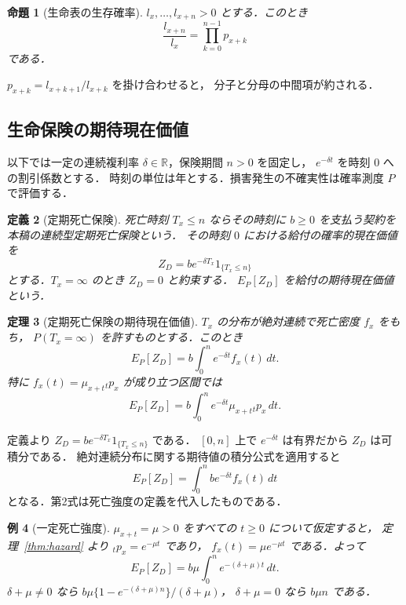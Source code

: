 \documentclass[a5paper,10pt,onecolumn]{jsarticle}
\makeatletter
\theoremstyle{mathnotetheorem}
\newtheorem{theorem}{定理}[section]
\newtheorem{definition}[theorem]{定義}
\newtheorem{proposition}[theorem]{命題}
\newtheorem{example}[theorem]{例}
\renewcommand{\proofname}{証明}
\renewenvironment{proof}[1][\proofname]{%
  \par\pushQED{\qed}\normalfont\topsep4\p@\@plus2\p@\relax
  \trivlist\item[\hskip\labelsep\bfseries #1]\ignorespaces
}{\popQED\endtrivlist\@endpefalse}
\newcommand{\R}{\mathbb{R}}
\makeatother
\begin{document}
\begin{proposition}[生命表の生存確率]\label{prop:lifetable}
$l_x,\ldots,l_{x+n}>0$ とする．このとき
\[
 \frac{l_{x+n}}{l_x}=\prod_{k=0}^{n-1}p_{x+k}
\]
である．
\end{proposition}
\begin{proof}
$p_{x+k}=l_{x+k+1}/l_{x+k}$ を掛け合わせると，
分子と分母の中間項が約される．\end{proof}

\subsection{生命保険の期待現在価値}

以下では一定の連続複利率 $\delta\in\R$，保険期間 $n>0$ を固定し，
$e^{-\delta t}$ を時刻 $0$ への割引係数とする．
時刻の単位は年とする．損害発生の不確実性は確率測度 $P$ で評価する．

\begin{definition}[定期死亡保険]
死亡時刻 $T_x\le n$ ならその時刻に $b\ge0$ を支払う契約を
本稿の\emph{連続型定期死亡保険}という．
その時刻 $0$ における給付の確率的現在価値を
\[
 Z_D=b e^{-\delta T_x}1_{\{T_x\le n\}}
\]
とする．$T_x=\infty$ のとき $Z_D=0$ と約束する．
$E_P[Z_D]$ を\emph{給付の期待現在価値}という．
\end{definition}

\begin{theorem}[定期死亡保険の期待現在価値]\label{thm:deathpv}
$T_x$ の分布が絶対連続で死亡密度 $f_x$ をもち，
$P(T_x=\infty)$ を許すものとする．このとき
\[
 E_P[Z_D]=b\int_0^n e^{-\delta t}f_x(t)\,dt.
\]
特に $f_x(t)=\mu_{x+t}{}_tp_x$ が成り立つ区間では
\[
 E_P[Z_D]=b\int_0^n e^{-\delta t}\mu_{x+t}{}_tp_x\,dt.
\]
\end{theorem}
\begin{proof}
定義より $Z_D=b e^{-\delta T_x}1_{\{T_x\le n\}}$ である．
$[0,n]$ 上で $e^{-\delta t}$ は有界だから $Z_D$ は可積分である．
絶対連続分布に関する期待値の積分公式を適用すると
\[
 E_P[Z_D]=\int_0^n b e^{-\delta t}f_x(t)\,dt
\]
となる．第2式は死亡強度の定義を代入したものである．\end{proof}

\begin{example}[一定死亡強度]
$\mu_{x+t}=\mu>0$ をすべての $t\ge0$ について仮定すると，
定理~\ref{thm:hazard} より ${}_tp_x=e^{-\mu t}$ であり，
$f_x(t)=\mu e^{-\mu t}$ である．よって
\[
 E_P[Z_D]=b\mu\int_0^n e^{-(\delta+\mu)t}\,dt.
\]
$\delta+\mu\ne0$ なら
$b\mu\{1-e^{-(\delta+\mu)n}\}/(\delta+\mu)$，
$\delta+\mu=0$ なら $b\mu n$ である．
\end{example}
\end{document}
